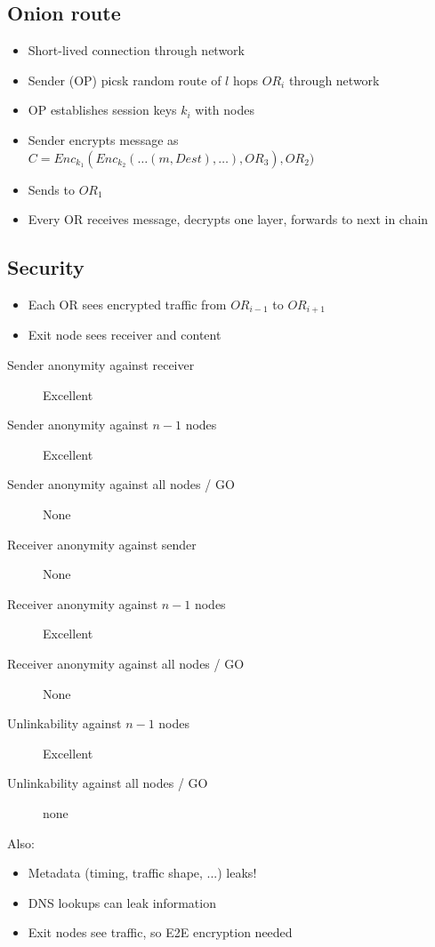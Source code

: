 \documentclass[a4paper]{scrreprt}
\begin{document}
\subsection{Onion route}

\begin{itemize}
		\item Short-lived connection through network
		\item Sender (OP) picsk random route of $l$ hops $OR_i$ through network
		\item OP establishes session keys $k_i$ with nodes
		\item Sender encrypts message as $C = Enc_{k_1}(Enc_{k_2}(\ldots(m,
				Dest), \ldots), OR_3), OR_2)$
		\item Sends to $OR_1$
		\item Every OR receives message, decrypts one layer, forwards to next in chain
\end{itemize}

\subsection{Security}

\begin{itemize}
		\item Each OR sees encrypted traffic from $OR_{i-1}$ to $OR_{i+1}$
		\item Exit node sees receiver and content
\end{itemize}

\begin{description}
		\item[Sender anonymity against receiver] Excellent
		\item[Sender anonymity against $n-1$ nodes] Excellent
		\item[Sender anonymity against all nodes / GO] None
		\item[Receiver anonymity against sender] None
		\item[Receiver anonymity against $n-1$ nodes] Excellent
		\item[Receiver anonymity against all nodes / GO] None
		\item[Unlinkability against $n-1$ nodes] Excellent
		\item[Unlinkability against all nodes / GO] none
\end{description}

Also:
\begin{itemize}
		\item Metadata (timing, traffic shape, ...) leaks!
		\item DNS lookups can leak information
		\item Exit nodes see traffic, so E2E encryption needed
\end{itemize}
\end{document}
